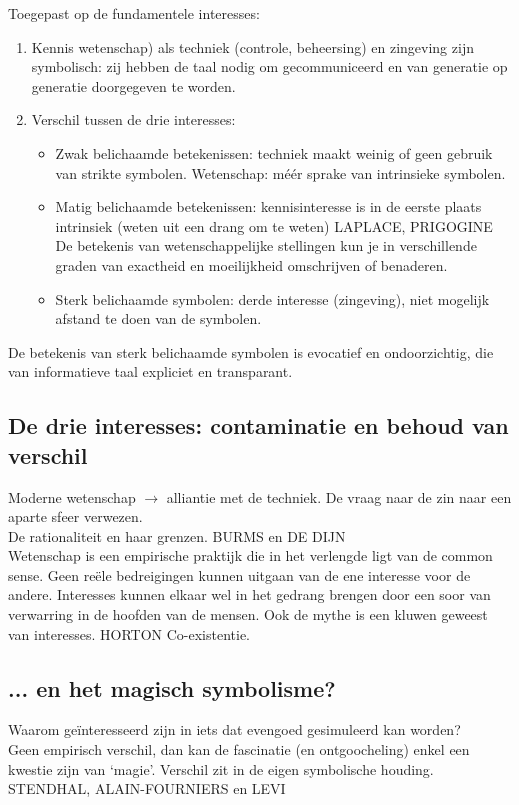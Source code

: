 \documentclass[11pt,a4paper]{article}
\begin{document}
Toegepast op de fundamentele interesses:
\begin{enumerate}
\item Kennis wetenschap) als techniek (controle, beheersing) en zingeving zijn symbolisch: zij hebben de taal nodig om gecommuniceerd en van generatie op generatie doorgegeven te worden.
\item Verschil tussen de drie interesses:
\begin{itemize}
\item Zwak belichaamde betekenissen: techniek maakt weinig of geen gebruik van strikte symbolen. 
	Wetenschap: méér sprake van intrinsieke symbolen.
\item Matig belichaamde betekenissen: kennisinteresse is in de eerste plaats intrinsiek (weten uit een drang om te weten) LAPLACE, PRIGOGINE
De betekenis van wetenschappelijke stellingen kun je in verschillende graden van exactheid en moeilijkheid omschrijven of benaderen. 
\item Sterk belichaamde symbolen: derde interesse (zingeving), niet mogelijk afstand te doen van de symbolen. 
\end{itemize}
\end{enumerate}
De betekenis van sterk belichaamde symbolen is evocatief en ondoorzichtig, die van informatieve taal expliciet en transparant. 
\subsection{De drie interesses: contaminatie en behoud van verschil}
Moderne wetenschap $\rightarrow$ alliantie met de techniek. De vraag naar de zin naar een aparte sfeer verwezen. 
\\
De rationaliteit en haar grenzen. BURMS en DE DIJN
\\
Wetenschap is een empirische praktijk die in het verlengde ligt van de common sense. Geen re\"ele bedreigingen kunnen uitgaan van de ene interesse voor de andere. Interesses kunnen elkaar wel in het gedrang brengen door een soor van verwarring in de hoofden van de mensen. 
Ook de mythe is een kluwen geweest van interesses. HORTON
Co-existentie.
\subsection{... en het magisch symbolisme?}
Waarom geïnteresseerd zijn in iets dat evengoed gesimuleerd kan worden?
\\
Geen empirisch verschil, dan kan de fascinatie (en ontgoocheling) enkel een kwestie zijn van ‘magie’. Verschil zit in de eigen symbolische houding. 
\\
STENDHAL, ALAIN-FOURNIERS en LEVI
\end{document}
